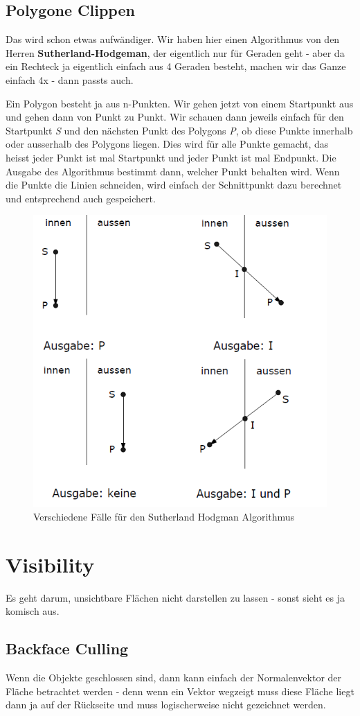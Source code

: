 \subsection{Polygone Clippen}
Das wird schon etwas aufwändiger. Wir haben hier einen Algorithmus von den Herren \textbf{Sutherland-Hodgeman}, der eigentlich nur für Geraden geht - aber da ein Rechteck ja eigentlich einfach aus 4 Geraden besteht, machen wir das Ganze einfach 4x - dann passts auch.

Ein Polygon besteht ja aus n-Punkten. Wir gehen jetzt von einem Startpunkt aus und gehen dann von Punkt zu Punkt. Wir schauen dann jeweils einfach für den Startpunkt \textit{S} und den nächsten Punkt des Polygons \textit{P}, ob diese Punkte innerhalb oder ausserhalb des Polygons liegen. Dies wird für alle Punkte gemacht, das heisst jeder Punkt ist mal Startpunkt und jeder Punkt ist mal Endpunkt. Die Ausgabe des Algorithmus bestimmt dann, welcher Punkt behalten wird. Wenn die Punkte die Linien schneiden, wird einfach der Schnittpunkt dazu berechnet und entsprechend auch gespeichert.
	
	\begin{figure}[!ht]
		\centering
		\includegraphics[width=0.5\linewidth]{fig/sutherland_hodgman}
		\caption{Verschiedene Fälle für den Sutherland Hodgman Algorithmus}
		\label{fig:sutherland_hodgman}
	\end{figure}

\section{Visibility}
Es geht darum, unsichtbare Flächen nicht darstellen zu lassen - sonst sieht es ja komisch aus.

\subsection{Backface Culling}
Wenn die Objekte geschlossen sind, dann kann einfach der Normalenvektor der Fläche betrachtet werden - denn wenn ein Vektor wegzeigt muss diese Fläche liegt dann ja auf der Rückseite und muss logischerweise nicht gezeichnet werden.

